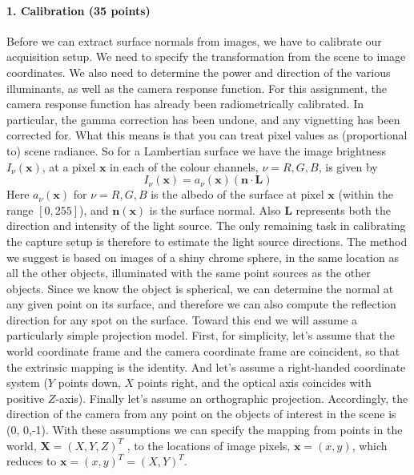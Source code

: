 \documentclass{paper}
\begin{document}
\paragraph{1. Calibration (35 points)}Before we can extract surface normals from images, we have to calibrate our acquisition setup. We need to specify the transformation from the scene to image coordinates. We also need to determine the power and direction of the various illuminants, as well as the camera response function.
For this assignment, the camera response function has already been radiometrically calibrated. In particular, the gamma correction has been undone, and any vignetting has been corrected for. What this means is that you can treat pixel values as (proportional to) scene radiance. So for a Lambertian surface we have the image brightness $I_\nu(\textbf{x})$, at a pixel $\textbf{x}$ in each of the colour channels, $\nu = R,G,B$, is given by
\begin{equation}
I_\nu(\textbf{x})=a_\nu(\textbf{x})(\mathbf{n}\cdot\mathbf{L})
\end{equation}
Here $a_\nu(\textbf{x})$ for $\nu=R,G,B$ is the albedo of the surface at pixel $\textbf{x}$ (within the range $[0,255]$), and $\mathbf{n}(\textbf{x})$ is the surface normal. Also $\mathbf{L}$ represents both the direction and intensity of the light source. 
The only remaining task in calibrating the capture setup is therefore to estimate the light source directions. The method we suggest is based on images of a shiny chrome sphere, in the same location as all the other objects, illuminated with the same point sources as the other objects. Since we know the object is spherical, we can determine the normal at any given point on its surface, and therefore we can also compute the reflection direction for any spot on the surface.
Toward this end we will assume a particularly simple projection model. First, for simplicity, let's assume that the world coordinate frame and the camera coordinate frame are coincident, so that the extrinsic mapping is the identity. And let's assume a right-handed coordinate system ($Y$ points down, $X$ points right, and the optical axis coincides with positive $Z$-axis). Finally let's assume an orthographic projection. Accordingly, the direction of the camera from any point on the objects of interest in the scene is (0, 0,-1).
With these assumptions we can specify the mapping from points in the world, $\textbf{X} =(X,Y,Z)^T$ , to the locations of image pixels, $\textbf{x}=(x,y)$, which reduces to $\textbf{x} =(x, y)^T = (X,Y )^T$.\newline
\end{document}
